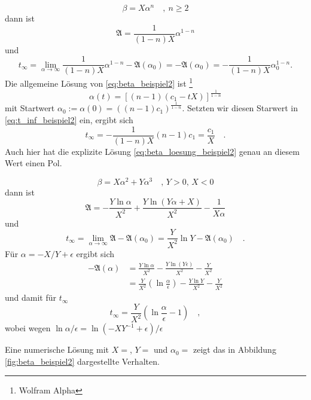 		\begin{example}
			\begin{equation}
			\beta = X \alpha^n \quad , \ n\geq 2 
			\label{eq:beta_beispiel2}
			\end{equation}
			dann ist 
			\begin{equation}
			\mathfrak{A}= \frac{1}{(1-n)X} \alpha^{1-n}
			\end{equation}
			und 
			\begin{equation}
			t_\infty = \lim\limits_{\alpha\to\infty}
			\frac{1}{(1-n)X} \alpha^{1-n} - \mathfrak{A}(\alpha_0)
			=-\mathfrak{A}(\alpha_0)=-\frac{1}{(1-n)X} \alpha_0^{1-n}.
			\label{eq:t_inf_beispiel2} 
			\end{equation}
			Die allgemeine Lösung von \eqref{eq:beta_beispiel2} ist 
			\footnote{Wolfram Alpha}
			\begin{equation}
			\alpha(t) =\left[(n-1) (c_1-t X)\right]^\frac{1}{1-n} 
			\label{eq:beta_loesung_beispiel2}
			\end{equation}
			mit Startwert $\alpha_0:=\alpha(0)=\left((n-1)c_1\right)
			^\frac{1}{1-n}$. Setzten wir diesen Starwert in 
			\eqref{eq:t_inf_beispiel2} ein, ergibt sich
			\begin{equation}
			t_\infty = -\frac{1}{(1-n)X}(n-1)c_1 = \frac{c_1}{X} \quad. 
			\end{equation}
			Auch hier hat die explizite Lösung 
			\eqref{eq:beta_loesung_beispiel2} genau an diesem Wert 
			einen Pol.
		\end{example}		
		
		\begin{example}
			\begin{equation}
			\beta = X \alpha^2 + Y\alpha^3 \quad , \, Y>0,\, X<0
			\end{equation}
			dann ist 
			\begin{equation}
			\mathfrak{A}=-\frac{Y \ln \alpha}{X^2}+
			\frac{Y \ln(Y\alpha +X)}{X^2}-\frac{1}{X\alpha}
			\end{equation}
			und 
			\begin{equation}
			t_\infty = \lim\limits_{\alpha\to\infty}\mathfrak{A} 
			-\mathfrak{A}(\alpha_0)= 
			\frac{Y}{X^2}\ln Y-\mathfrak{A}(\alpha_0) \quad .			
			\end{equation}
			Für $\alpha=-X/Y+\epsilon$ ergibt sich			
			\begin{align}
			-\mathfrak{A}(\alpha)&=\frac{Y\ln \alpha}{X^2}
			-\frac{Y \ln(Y\epsilon)}{X^2}-\frac{Y}{X^2}		\\
			&= \frac{Y}{X^2}\left(\ln\frac{\alpha}{\epsilon}\right) 
			-\frac{Y \ln Y}{X^2}-\frac{Y}{X^2}
			\end{align}
			und damit für $t_\infty$
			\begin{equation}
			t_\infty = \frac{Y}{X^2}\left(  \ln \frac{\alpha}{
			\epsilon}-1\right) \quad ,
			\end{equation}			
			wobei wegen $\ln \alpha/\epsilon = \ln (-XY^{-1}+
			\epsilon)/\epsilon$			
			
			
			Eine numerische Lösung mit $X=$, $Y=$ und $\alpha_0=$ 
			zeigt das in Abbildung \ref{fig:beta_beispiel2} 
			dargestellte Verhalten.
		\end{example}
		
		
		
		

